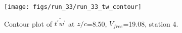 \begin{figure}[H]
\centering
\texttt{[image: figs/run\_33/run\_33\_tw\_contour]}
\caption{Contour plot of $\overline{t^\prime w^\prime}$ at $z/c$=8.50, $V_{free}$=19.08, station 4.}
\label{fig:run_33_tw_contour}
\end{figure}


